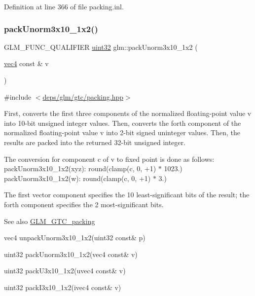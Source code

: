 Definition at line 366 of file packing.\+inl.

\mbox{\label{group__gtc__packing_ga2cf2d11b40bd48639110456fd74c2e33}} 
\subsubsection{\texorpdfstring{pack\+Unorm3x10\+\_\+1x2()}{packUnorm3x10\_1x2()}}
{\footnotesize\ttfamily G\+L\+M\+\_\+\+F\+U\+N\+C\+\_\+\+Q\+U\+A\+L\+I\+F\+I\+ER \hyperlink{group__gtc__type__precision_ga202b6a53c105fcb7e531f9b443518451}{uint32} glm\+::pack\+Unorm3x10\+\_\+1x2 (\begin{DoxyParamCaption}\item[{\hyperlink{group__core__types_ga5881b1b022d7fd1b7218f5916532dd02}{vec4} const \&}]{v }\end{DoxyParamCaption})}



{\ttfamily \#include $<$\hyperlink{gtc_2packing_8hpp}{deps/glm/gtc/packing.\+hpp}$>$}

First, converts the first three components of the normalized floating-\/point value v into 10-\/bit unsigned integer values. Then, converts the forth component of the normalized floating-\/point value v into 2-\/bit signed uninteger values. Then, the results are packed into the returned 32-\/bit unsigned integer.

The conversion for component c of v to fixed point is done as follows\+: pack\+Unorm3x10\+\_\+1x2(xyz)\+: round(clamp(c, 0, +1) $\ast$ 1023.) pack\+Unorm3x10\+\_\+1x2(w)\+: round(clamp(c, 0, +1) $\ast$ 3.)

The first vector component specifies the 10 least-\/significant bits of the result; the forth component specifies the 2 most-\/significant bits.

\begin{DoxySeeAlso}{See also}
\hyperlink{group__gtc__packing}{G\+L\+M\+\_\+\+G\+T\+C\+\_\+packing} 

vec4 unpack\+Unorm3x10\+\_\+1x2(uint32 const\& p) 

uint32 pack\+Unorm3x10\+\_\+1x2(vec4 const\& v) 

uint32 pack\+U3x10\+\_\+1x2(uvec4 const\& v) 

uint32 pack\+I3x10\+\_\+1x2(ivec4 const\& v) 
\end{DoxySeeAlso}


